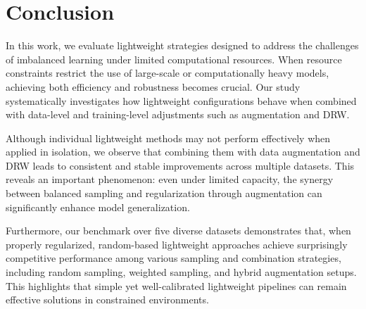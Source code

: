 \section{Conclusion} \label{sec:conclusion}

In this work, we evaluate lightweight strategies designed to address the challenges of imbalanced learning under limited computational resources. When resource constraints restrict the use of large-scale or computationally heavy models, achieving both efficiency and robustness becomes crucial. Our study systematically investigates how lightweight configurations behave when combined with data-level and training-level adjustments such as augmentation and DRW.

Although individual lightweight methods may not perform effectively when applied in isolation, we observe that combining them with data augmentation and DRW leads to consistent and stable improvements across multiple datasets. This reveals an important phenomenon: even under limited capacity, the synergy between balanced sampling and regularization through augmentation can significantly enhance model generalization.

Furthermore, our benchmark over five diverse datasets demonstrates that, when properly regularized, random-based lightweight approaches achieve surprisingly competitive performance among various sampling and combination strategies, including random sampling, weighted sampling, and hybrid augmentation setups. This highlights that simple yet well-calibrated lightweight pipelines can remain effective solutions in constrained environments.